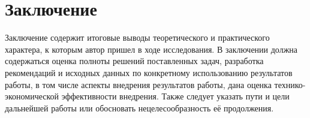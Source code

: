 \chapter*{Заключение}

Заключение содержит итоговые выводы теоретического и практического характера, к которым автор пришел в ходе исследования. В заключении должна содержаться оценка полноты решений поставленных задач, разработка рекомендаций и исходных данных по конкретному использованию результатов работы, в том числе аспекты внедрения результатов работы, дана оценка технико-экономической эффективности внедрения. Также следует указать пути и цели дальнейшей работы или обосновать нецелесообразность её продолжения.